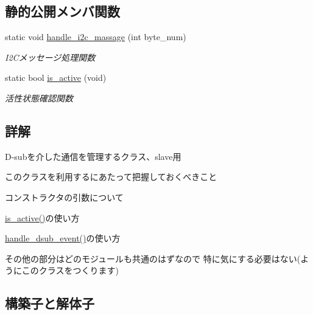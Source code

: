 \subsection*{静的公開メンバ関数}
\begin{DoxyCompactItemize}
\item 
static void \mbox{\hyperlink{class_dsub_slave_communicator_a0bec7ba63d137c6b50b1c7f651792deb}{handle\+\_\+i2c\+\_\+massage}} (int byte\+\_\+num)
\begin{DoxyCompactList}\small\item\em I2\+Cメッセージ処理関数 \end{DoxyCompactList}\item 
static bool \mbox{\hyperlink{class_dsub_slave_communicator_a7a7d6e43b95833e698761442b0741e72}{is\+\_\+active}} (void)
\begin{DoxyCompactList}\small\item\em 活性状態確認関数 \end{DoxyCompactList}\end{DoxyCompactItemize}


\subsection{詳解}
D-\/subを介した通信を管理するクラス、slave用 

このクラスを利用するにあたって把握しておくべきこと
\begin{DoxyItemize}
\item コンストラクタの引数について
\item \mbox{\hyperlink{class_dsub_slave_communicator_a7a7d6e43b95833e698761442b0741e72}{is\+\_\+active()}}の使い方
\item \mbox{\hyperlink{class_dsub_slave_communicator_aef578741915e2e109b7b4d7813693cfe}{handle\+\_\+dsub\+\_\+event()}}の使い方
\end{DoxyItemize}

その他の部分はどのモジュールも共通のはずなので 特に気にする必要はない(ようにこのクラスをつくります) 

\subsection{構築子と解体子}
\mbox{\label{class_dsub_slave_communicator_a5d5d26f4fa61073bf85c01aa859f4f2e}} 
